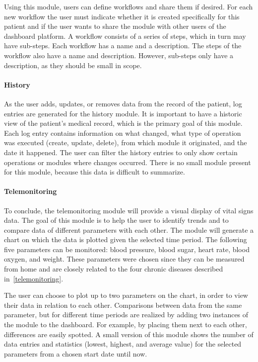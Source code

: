         Using this module, users can define workflows and share them if desired. For each new workflow the user must indicate whether it is created specifically for this patient and if the user wants to share the module with other users of the dashboard platform. A workflow consists of a series of steps, which in turn may have sub-steps. Each workflow has a name and a description. The steps of the workflow also have a name and description. However, sub-steps only have a description, as they should be small in scope.

        \paragraph{History} As the user adds, updates, or removes data from the record of the patient, log entries are generated for the history module. It is important to have a historic view of the patient's medical record, which is the primary goal of this module. Each log entry contains information on what changed, what type of operation was executed (create, update, delete), from which module it originated, and the date it happened. The user can filter the history entries to only show certain operations or modules where changes occurred. There is no small module present for this module, because this data is difficult to summarize.

        \paragraph{Telemonitoring} To conclude, the telemonitoring module will provide a visual display of vital signs data. The goal of this module is to help the user to identify trends and to compare data of different parameters with each other. The module will generate a chart on which the data is plotted given the selected time period. The following five parameters can be monitored: blood pressure, blood sugar, heart rate, blood oxygen, and weight. These parameters were chosen since they can be measured from home and are closely related to the four chronic diseases described in~\ref{telemonitoring}.

        The user can choose to plot up to two parameters on the chart, in order to view their data in relation to each other. Comparisons between data from the same parameter, but for different time periods are realized by adding two instances of the module to the dashboard. For example, by placing them next to each other, differences are easily spotted. A small version of this module shows the number of data entries and statistics (lowest, highest, and average value) for the selected parameters from a chosen start date until now.